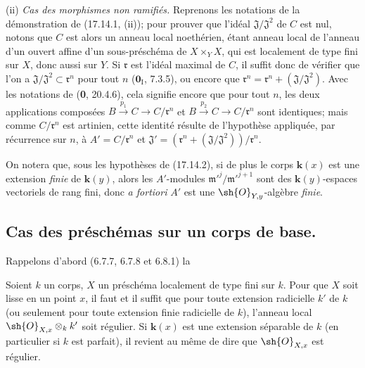 (ii) \emph{Cas des morphismes non ramifiés.} Reprenons les notations de la démonstration de (17.14.1, (ii)); pour prouver que l'idéal $\mathfrak{J}/\mathfrak{J}^2$ de $C$ est nul, notons que $C$ est alors un anneau local noethérien, étant anneau local de l'anneau d'un ouvert affine d'un sous-préschéma de $X\times_YX$, qui est localement de type fini sur $X$, donc aussi sur $Y$. Si $\mathfrak r$ est l'idéal maximal de $C$, il suffit donc de vérifier que l'on a $\mathfrak{J}/\mathfrak{J}^2\subset\mathfrak r^n$ pour tout $n$ ($\mathbf{0}_{\mathrm I}$, 7.3.5), ou encore que $\mathfrak r^n=\mathfrak r^n+(\mathfrak{J}/\mathfrak{J}^2)$. Avec les notations de (\textbf{0}, 20.4.6), cela signifie encore que pour tout $n$, les deux applications composées $B\xrightarrow{p_1}C\to C/\mathfrak r^n$ et $B\xrightarrow{p_2}C\to C/\mathfrak r^n$ sont identiques; mais comme $C/\mathfrak r^n$ est artinien, cette identité résulte de l'hypothèse appliquée, par récurrence sur $n$, à $A'=C/\mathfrak r^n$ et $\mathfrak{J}'=(\mathfrak r^n+(\mathfrak{J}/\mathfrak{J}^2))/\mathfrak r^n$.

\begin{remark}[17.14.3]
\label{IV.17.14.3}
On notera que, sous les hypothèses de (17.14.2), si de plus le corps $\boldsymbol{k}(x)$ est une extension \emph{finie} de $\boldsymbol{k}(y)$, alors les $A'$-modules $\mathfrak m'^{j}/\mathfrak m'^{j+1}$ sont des $\boldsymbol{k}(y)$-espaces vectoriels de rang fini, donc \emph{a fortiori} $A'$ est une $\sh{O}_{Y,y}$-algèbre \emph{finie}.
\end{remark}

\subsection{Cas des préschémas sur un corps de base.}

Rappelons d'abord (6.7.7, 6.7.8 et 6.8.1) la

\begin{proposition}[17.15.1]
\label{IV.17.15.1}
Soient $k$ un corps, $X$ un préschéma localement de type fini sur $k$. Pour que $X$ soit lisse en un point $x$, il faut et il suffit que pour toute extension radicielle $k'$ de $k$ \textup{(ou seulement pour toute extension} finie radicielle \textup{de} $k$\textup{)}, l'anneau local $\sh{O}_{X,x}\otimes_k k'$ soit régulier. Si $\boldsymbol{k}(x)$ est une extension séparable de $k$ \textup{(en particulier si} $k$ \textup{est} parfait\textup{)}, il revient au même de dire que $\sh{O}_{X,x}$ est régulier.
\end{proposition}

